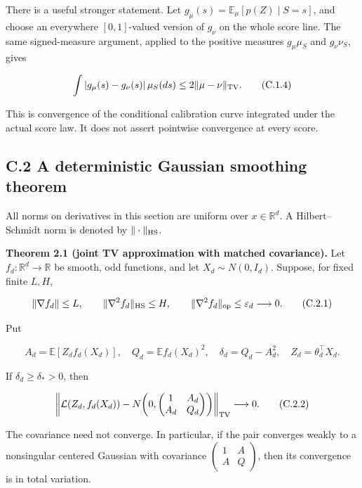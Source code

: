 \documentclass[
  11pt,
  a4paper,
]{article}
\begin{document}
There is a useful stronger statement. Let
\(g_\mu(s)=\mathbb E_\mu[p(Z)\mid S=s]\), and choose an everywhere
\([0,1]\)-valued version of \(g_\nu\) on the whole score line. The same
signed-measure argument, applied to the positive measures \(g_\mu\mu_S\)
and \(g_\nu\nu_S\), gives

\[
\int |g_\mu(s)-g_\nu(s)|\,\mu_S(ds)
 \le 2\|\mu-\nu\|_{\rm TV}.
\tag{C.1.4}
\]

This is convergence of the conditional calibration curve integrated
under the actual score law. It does not assert pointwise convergence at
every score.

\hypertarget{c.2-a-deterministic-gaussian-smoothing-theorem}{%
\subsection{C.2 A deterministic Gaussian smoothing
theorem}\label{c.2-a-deterministic-gaussian-smoothing-theorem}}

All norms on derivatives in this section are uniform over
\(x\in\mathbb R^d\). A Hilbert--Schmidt norm is denoted by
\(\|\cdot\|_{\rm HS}\).

\textbf{Theorem 2.1 (joint TV approximation with matched covariance).}
Let \(f_d:\mathbb R^d\to\mathbb R\) be smooth, odd functions, and let
\(X_d\sim N(0,I_d)\). Suppose, for fixed finite \(L,H\),

\[
\|\nabla f_d\|\le L,\qquad
\|\nabla^2 f_d\|_{\rm HS}\le H,\qquad
\|\nabla^2 f_d\|_{\rm op}\le\varepsilon_d\longrightarrow0.
\tag{C.2.1}
\]

Put

\[
A_d=\mathbb E[Z_df_d(X_d)],\quad
Q_d=\mathbb E f_d(X_d)^2,\quad
\delta_d=Q_d-A_d^2,
\quad Z_d=\theta_d^\top X_d.
\]

If \(\delta_d\ge\delta_*>0\), then

\[
\left\|\mathcal L(Z_d,f_d(X_d))-
 N\!\left(0,\begin{pmatrix}1&A_d\\A_d&Q_d\end{pmatrix}\right)
\right\|_{\rm TV}\longrightarrow0.
\tag{C.2.2}
\]

The covariance need not converge. In particular, if the pair converges
weakly to a nonsingular centered Gaussian with covariance
\(\left(\begin{smallmatrix}1&A\\A&Q\end{smallmatrix}\right)\), then its
convergence is in total variation.
\end{document}
